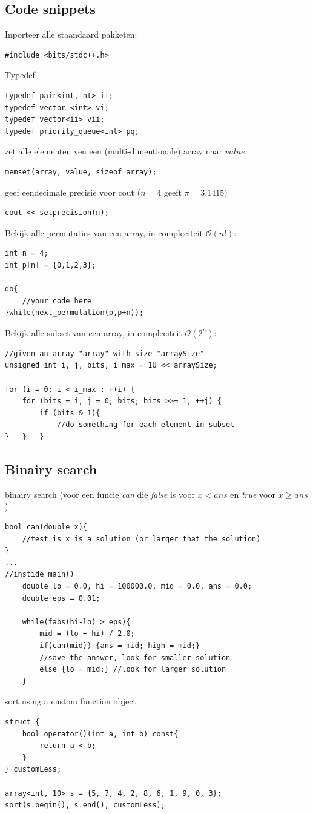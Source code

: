 \documentclass[10pt,a4paper,titlepage]{article}
\renewcommand{\O}{\mathcal{O}}
\begin{document}
\subsection{Code snippets}
Inporteer alle staandaard pakketen:
\begin{lstlisting}
#include <bits/stdc++.h>
\end{lstlisting}

Typedef
\begin{lstlisting}
typedef pair<int,int> ii;
typedef vector <int> vi;
typedef vector<ii> vii;
typedef priority_queue<int> pq;
\end{lstlisting}


zet alle elementen ven een (multi-dimentionale) array naar $value$:
\begin{lstlisting}
memset(array, value, sizeof array);
\end{lstlisting}

geef eendecimale precisie voor cout ($n=4$ geeft $\pi = 3.1415$)
\begin{lstlisting}
cout << setprecision(n);
\end{lstlisting}

Bekijk alle permutaties van een array, in compleciteit $\O(n!)$:
\begin{lstlisting}
int n = 4;
int p[n] = {0,1,2,3};	

do{
	//your code here
}while(next_permutation(p,p+n));
\end{lstlisting}

Bekijk alle subset van een array, in compleciteit $\O(2^n)$:
\begin{lstlisting}
//given an array "array" with size "arraySize"
unsigned int i, j, bits, i_max = 1U << arraySize;
	
for (i = 0; i < i_max ; ++i) {
	for (bits = i, j = 0; bits; bits >>= 1, ++j) {
		if (bits & 1){
			//do something for each element in subset
}	}	}
\end{lstlisting}


\subsection{Binairy search}
binairy search (voor een funcie \emph{can} die \emph{false} is voor $x < ans$ en \emph{true} voor $x\geq ans$)

\begin{lstlisting}
bool can(double x){
	//test is x is a solution (or larger that the solution)
}
...
//instide main()
	double lo = 0.0, hi = 100000.0, mid = 0.0, ans = 0.0;
	double eps = 0.01;
	
	while(fabs(hi-lo) > eps){
		mid = (lo + hi) / 2.0;
		if(can(mid)) {ans = mid; high = mid;} 
		//save the answer, look for smaller solution
		else {lo = mid;} //look for larger solution
	}
\end{lstlisting}
sort using a custom function object
\begin{lstlisting}
struct {
	bool operator()(int a, int b) const{   
		return a < b;
	}   
} customLess;

array<int, 10> s = {5, 7, 4, 2, 8, 6, 1, 9, 0, 3}; 
sort(s.begin(), s.end(), customLess);
\end{lstlisting}
\end{document}
